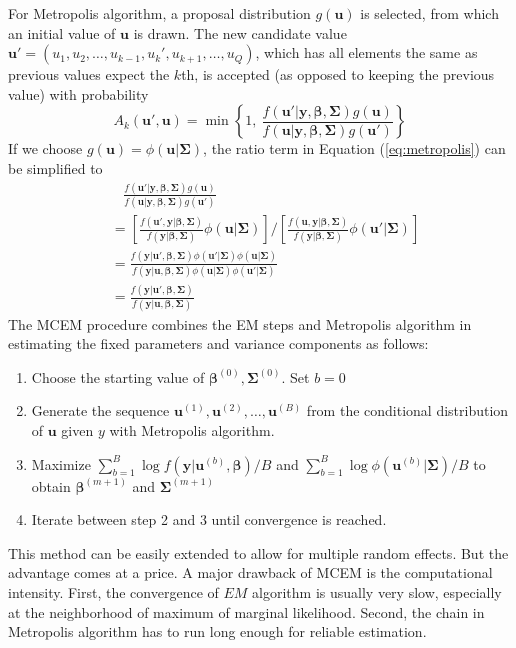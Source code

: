 For Metropolis algorithm, a proposal distribution $g(\bm u)$ is selected, from which an initial
value of $\bm u$ is drawn. The new candidate value $\bm u' = (u_1, u_2, \ldots,u_{k-1}, u_k',
u_{k+1}, \ldots, u_Q)$, which has all elements the same as previous values expect the $k$th,   is
accepted (as opposed to keeping the previous value) with probability
\begin{equation}\label{eq:metropolis}
	A_k(\bm u', \bm u) = \min \left\{1, ~\frac{f(\bm u'|\bm y, \bm \beta, \bm \Sigma)g(\bm u)}{f(\bm
		u|\bm y, \bm \beta, \bm \Sigma)g(\bm u')}\right\}
\end{equation}
If we choose $g(\bm u) = \phi (\bm u|\bm\Sigma)$, the ratio term in Equation (\ref{eq:metropolis})
can be simplified to 
\begin{equation}\label{eq2.3.4}
	\begin{aligned}
		& ~~~~\frac{f(\bm u'|\bm y, \bm \beta, \bm \Sigma)g(\bm u)}{f(\bm u|\bm y, \bm \beta, \bm
			\Sigma)g(\bm u')} \\
		& = \left[\frac{f(\bm u', \bm y| \bm \beta, \bm \Sigma)}{f(\bm y| \bm \beta, \bm \Sigma)}\phi (\bm
		u|\bm\Sigma)\right]/\left[
		\frac{f(\bm u, \bm y|\bm \beta, \bm \Sigma)}{f(\bm y|\bm \beta, \bm \Sigma)}\phi (\bm
		u'|\bm\Sigma)\right]\\
		& = \frac{f(\bm y|\bm u', \bm \beta, \bm \Sigma)\phi (\bm u'|\bm\Sigma)\phi (\bm
			u|\bm\Sigma)}{f(\bm y|\bm u, \bm \beta, \bm \Sigma)\phi (\bm u|\bm\Sigma)\phi (\bm u'|\bm\Sigma)}\\
		& = \frac{f(\bm y|\bm u', \bm \beta, \bm \Sigma)}{f(\bm y|\bm u, \bm \beta, \bm \Sigma)}
	\end{aligned}
\end{equation}
The MCEM procedure combines the EM steps and Metropolis algorithm in estimating the fixed
parameters and variance components as follows:
\begin{enumerate}
	\item Choose the starting value of $\bm \beta^{(0)}, \bm \Sigma^{(0)}$. Set $b= 0$
	\item Generate the sequence $\bm u^{(1)}, \bm u^{(2)}, \ldots, \bm u^{(B)}$ from the conditional
	distribution of $\bm u$ given $y$ with Metropolis algorithm.
	\item Maximize $\sum_{b=1}^B \log f(\bm y|\bm u^{(b)}, \bm\beta)/B$ and $\sum_{b=1}^B\log\phi(\bm
	u^{(b)}|\bm \Sigma)/B$ to obtain $\bm \beta^{(m+1)}$ and $\bm\Sigma^{(m+1)}$
	\item Iterate between step 2 and 3 until convergence is reached.
\end{enumerate}
This method can be easily extended to allow for multiple random effects. But the advantage comes
at a price. A major drawback of MCEM is the computational intensity.  First, the convergence of $EM$
algorithm is usually very slow, especially at the neighborhood of maximum of marginal likelihood.
Second, the chain in Metropolis algorithm has to run long enough for reliable estimation. 

